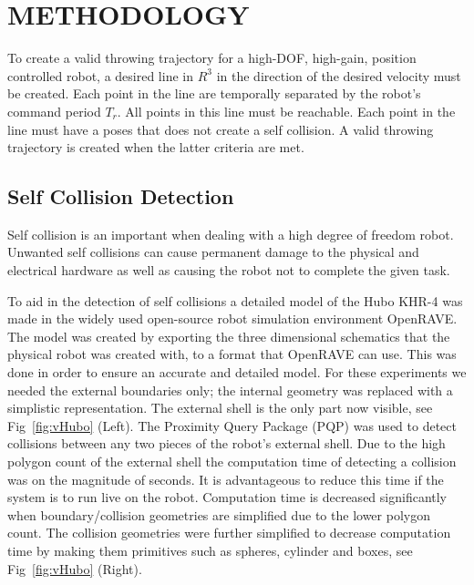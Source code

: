 \section{METHODOLOGY}\label{sec:methodology}
To create a valid throwing trajectory for a high-DOF, high-gain, position controlled robot, a desired line in $R^3$ in the direction of the desired velocity must be created.  Each point in the line are temporally separated by the robot's command period $T_r$.  All points in this line must be reachable.  Each point in the line must have a poses that does not create a self collision.  A valid throwing trajectory is created when the latter criteria are met.

\subsection{Self Collision Detection}\label{sec:selfCollision}
Self collision is an important when dealing with a high degree of freedom robot.  Unwanted self collisions can cause permanent damage to the physical and electrical hardware as well as causing the robot not to complete the given task.

To aid in the detection of self collisions a detailed model of the Hubo KHR-4 was made in the widely used open-source robot simulation environment OpenRAVE\cite{diankovThesis}.  The model was created by exporting the three dimensional schematics that the physical robot was created with, to a format that OpenRAVE can use.  This was done in order to ensure an accurate and detailed model.  For these experiments we needed the external boundaries only; the internal geometry was replaced with a simplistic representation.  The external shell is the only part now visible, see Fig~\ref{fig:vHubo} (Left).  The Proximity Query Package (PQP) was used to detect collisions between any two pieces of the robot's external shell.  Due to the high polygon count of the external shell the computation time of detecting a collision was on the magnitude of seconds.  It is advantageous to reduce this time if the system is to run live on the robot.  Computation time is decreased significantly when boundary/collision geometries are simplified due to the lower polygon count.  The collision geometries were further simplified to decrease computation time by making them primitives such as spheres, cylinder and boxes, see Fig~\ref{fig:vHubo} (Right). 

